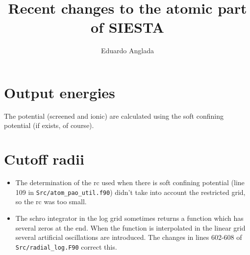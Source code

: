 \documentclass[12pt]{article}
\title{Recent changes to the atomic part of SIESTA}
\author{Eduardo Anglada}
\begin{document}
\maketitle
\tableofcontents


\section{Output energies}

The potential (screened and ionic) are calculated using the soft confining potential (if exists, of course).

\section{Cutoff radii}

\begin{itemize}
\item The determination of the rc used when there is soft confining potential (line 109 in  \verb+Src/atom_pao_util.f90+)  didn't take into account the restricted grid, so the rc was too small.

\item The schro integrator in the log grid sometimes returns a function which has several zeros at the end. When the function is interpolated in the linear grid several artificial oscillations are introduced. The changes in lines 602-608 of \verb+Src/radial_log.F90+ correct this.
\end{itemize}
\end{document}
